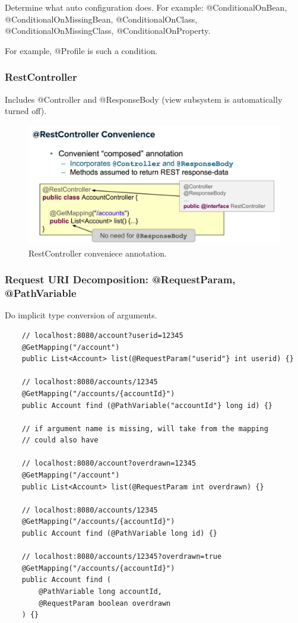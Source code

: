 \documentclass{scrartcl}
\begin{document}
Determine what auto configuration does. For example: @ConditionalOnBean, @ConditionalOnMissingBean, @ConditionalOnClass, @ConditionalOnMissingClass, @ConditionalOnProperty.

For example, @Profile is such a condition.

\subsubsection{RestController}

Includes @Controller and @ResponseBody (view subsystem is automatically turned off).

\begin{figure}
    \centering
    \includegraphics[width=1\linewidth]{restcontroller}
    \caption{RestController conveniece annotation.}
    \label{fig:restcontroller}
\end{figure}

\subsubsection{Request URI Decomposition: @RequestParam, @PathVariable}

Do implicit type conversion of arguments.

\begin{lstlisting}
    // localhost:8080/account?userid=12345
    @GetMapping("/account")
    public List<Account> list(@RequestParam("userid"} int userid) {}

    // localhost:8080/accounts/12345
    @GetMapping("/accounts/{accountId}")
    public Account find (@PathVariable("accountId"} long id) {}

    // if argument name is missing, will take from the mapping
    // could also have

    // localhost:8080/account?overdrawn=12345
    @GetMapping("/account")
    public List<Account> list(@RequestParam int overdrawn) {}

    // localhost:8080/accounts/12345
    @GetMapping("/accounts/{accountId}")
    public Account find (@PathVariable long id) {}

    // localhost:8080/accounts/12345?overdrawn=true
    @GetMapping("/accounts/{accountId}")
    public Account find (
        @PathVariable long accountId,
        @RequestParam boolean overdrawn
    ) {}



\end{lstlisting}
\end{document}
